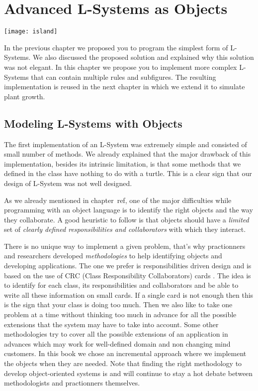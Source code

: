 \ifx\wholebook\relax\else



\fi

\project
\chapter{Advanced L-Systems as Objects}\label{ch:lsystem2}

\begin{chapterfigure}
\texttt{[image: island]}
\end{chapterfigure}

In the previous chapter we proposed you to program the simplest form
of L-Systems. We also discussed the proposed solution and explained
why this solution was not elegant. In this chapter we propose you to
implement more complex L-Systems that can contain multiple rules and
subfigures. The resulting implementation is reused in the next chapter
in which we extend it to simulate plant growth.

\section{Modeling L-Systems with Objects}
The first implementation of an L-System was extremely simple and
consisted of small number of methods. We already explained that the
major drawback of this implementation,  besides its intrinsic limitation,
is that some methods that we defined in the class  have nothing
to do with a turtle. This is a clear sign that our design of L-System
was not well designed.

As we already mentioned in chapter~ref{}, one of the major
difficulties while programming with an object language is to identify
the right objects and the way they collaborate. A good heuristic to
follow is that objects should have a \emph{limited} set of
\emph{clearly defined responsibilities and collaborators} with
which they interact.

There is no unique way to implement a given problem, that's why
practionners and researchers developed \emph{methodologies} to help
identifying objects and developing applications. The one we prefer is
responsibilities driven design \cite{Wirf90} and is based on the use
of CRC (Class Responsibility Collaborators) cards \cite{CRC}.  The
idea is to identify for each class, its responsibilities and
collaborators and be able to write all these information on small
cards. If a single card is not enough then this is the sign that your
class is doing too much. Then we also like to take one problem at a
time without thinking too much in advance for all the possible
extensions that the system may have to take into account.  Some other
methodologies try to cover all the possible extensions of an
application in advances which may work for well-defined domain and non
changing mind customers. In this book we chose an incremental approach
where we implement the objects when they are needed.  Note that
finding the right methodology to develop object-oriented systems is
and will continue to stay a hot debate between methodologists and
practionners themselves.


